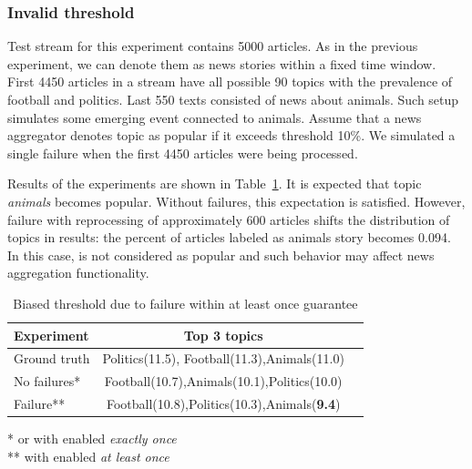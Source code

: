 \subsubsection{Invalid threshold}


Test stream for this experiment contains 5000 articles. As in the previous experiment, we can denote them as news stories within a fixed time window. First 4450 articles in a stream have all possible 90 topics with the prevalence of football and politics. Last 550 texts consisted of news about animals. Such setup simulates some emerging event connected to animals. Assume that a news aggregator denotes topic as popular if it exceeds threshold 10\%. We simulated a single failure when the first 4450 articles were being processed.

Results of the experiments are shown in Table~\ref{biased_threshold}. It is expected that topic {\em animals} becomes popular. Without failures, this expectation is satisfied. However, failure with reprocessing of approximately 600 articles shifts the distribution of topics in results: the percent of articles labeled as animals story becomes 0.094. In this case, is not considered as popular and such behavior may affect news aggregation functionality.

\begin{table}[htbp]
\caption{Biased threshold due to failure within at least once guarantee}
\begin{threeparttable}
\begin{tabular}{lcl}
Experiment    & Top 3 topics    \\
\hline
Ground truth   &   Politics(11.5), Football(11.3),Animals(11.0)    \\
No failures*   &   Football(10.7),Animals(10.1),Politics(10.0)    \\
Failure**   &   Football(10.8),Politics(10.3),Animals({\bf 9.4})    \\
\end{tabular}
* or with enabled {\em exactly once} \\
** with enabled {\em at least once}
\end{threeparttable}
\label{biased_threshold}
\end{table}

